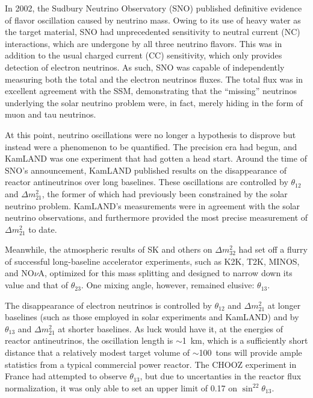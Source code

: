 \documentclass[../thesis.tex]{subfiles}
\begin{document}
In 2002, the Sudbury Neutrino Observatory (SNO) published definitive evidence of flavor oscillation caused by neutrino mass. Owing to its use of heavy water as the target material, SNO had unprecedented sensitivity to neutral current (NC) interactions, which are undergone by all three neutrino flavors. This was in addition to the usual charged current (CC) sensitivity, which only provides detection of electron neutrinos. As such, SNO was capable of independently measuring both the total and the electron neutrinos fluxes. The total flux was in excellent agreement with the SSM, demonstrating that the ``missing'' neutrinos underlying the solar neutrino problem were, in fact, merely hiding in the form of muon and tau neutrinos.

At this point, neutrino oscillations were no longer a hypothesis to disprove but instead were a phenomenon to be quantified. The precision era had begun, and KamLAND was one experiment that had gotten a head start. Around the time of SNO's announcement, KamLAND published results on the disappearance of reactor antineutrinos over long baselines. These oscillations are controlled by $\theta_{12}$ and $\Delta m^2_{21}$, the former of which had previously been constrained by the solar neutrino problem. KamLAND's measurements were in agreement with the solar neutrino observations, and furthermore provided the most precise measurement of $\Delta m^2_{21}$ to date.

Meanwhile, the atmospheric results of SK and others on $\Delta m^2_{32}$ had set off a flurry of successful long-baseline accelerator experiments, such as K2K, T2K, MINOS, and NO$\nu$A, optimized for this mass splitting and designed to narrow down its value and that of $\theta_{23}$. One mixing angle, however, remained elusive: $\theta_{13}$.

The disappearance of electron neutrinos is controlled by $\theta_{12}$ and $\Delta m^2_{21}$ at longer baselines (such as those employed in solar experiments and KamLAND) and by $\theta_{13}$ and $\Delta m^2_{21}$ at shorter baselines. As luck would have it, at the energies of reactor antineutrinos, the oscillation length is $\sim$1~km, which is a sufficiently short distance that a relatively modest target volume of $\sim$100~tons will provide ample statistics from a typical commercial power reactor. The CHOOZ experiment in France had attempted to observe $\theta_{13}$, but due to uncertanties in the reactor flux normalization, it was only able to set an upper limit of 0.17 on $\sin^22\theta_{13}$.
\end{document}
